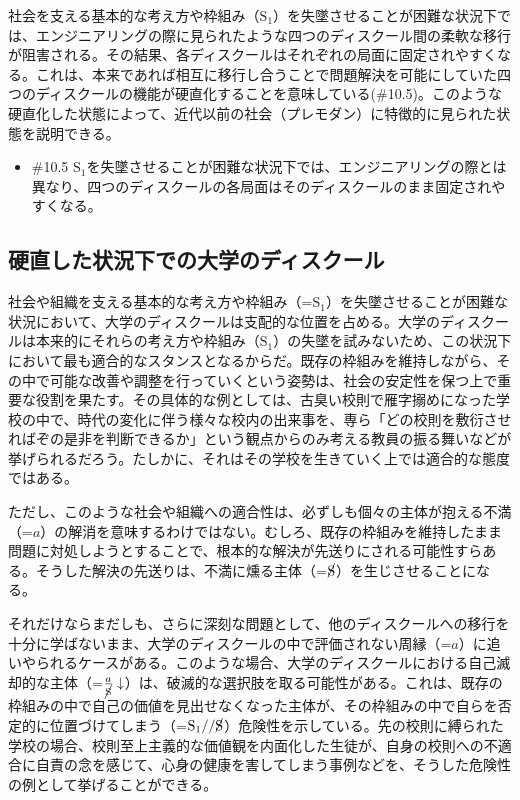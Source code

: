 社会を支える基本的な考え方や枠組み（\(\textrm{S}_1\)）を失墜させることが困難な状況下では、エンジニアリングの際に見られたような四つのディスクール間の柔軟な移行が阻害される。その結果、各ディスクールはそれぞれの局面に固定されやすくなる。これは、本来であれば相互に移行し合うことで問題解決を可能にしていた四つのディスクールの機能が硬直化することを意味している(\#10.5)。このような硬直化した状態によって、近代以前の社会（プレモダン）に特徴的に見られた状態を説明できる。

\begin{note}{}
  \begin{itemize}
    \tightlist
    \item{\#10.5}
      $\textrm{S}_1$を失墜させることが困難な状況下では、エンジニアリングの際とは異なり、四つのディスクールの各局面はそのディスクールのまま固定されやすくなる。
  \end{itemize}
\end{note}

\subsection{硬直した状況下での大学のディスクール}\label{ux786cux76f4ux3057ux305fux72b6ux6cc1ux4e0bux3067ux306eux5927ux5b66ux306eux30c7ux30a3ux30b9ux30afux30fcux30eb}

社会や組織を支える基本的な考え方や枠組み（=\(\textrm{S}_1\)）を失墜させることが困難な状況において、\mbox{大学のディスクール}は支配的な位置を占める。\mbox{大学のディスクール}は本来的にそれらの考え方や枠組み（\(\textrm{S}_1\)）の失墜を試みないため、この状況下において最も適合的なスタンスとなるからだ。既存の枠組みを維持しながら、その中で可能な改善や調整を行っていくという姿勢は、社会の安定性を保つ上で重要な役割を果たす。その具体的な例としては、古臭い校則で雁字搦めになった学校の中で、時代の変化に伴う様々な校内の出来事を、専ら「どの校則を敷衍させればぞの是非を判断できるか」という観点からのみ考える教員の振る舞いなどが挙げられるだろう。たしかに、それはその学校を生きていく上では適合的な態度ではある。

ただし、このような社会や組織への適合性は、必ずしも個々の主体が抱える不満（=\(a\)）の解消を意味するわけではない。むしろ、既存の枠組みを維持したまま問題に対処しようとすることで、根本的な解決が先送りにされる可能性すらある。そうした解決の先送りは、不満に燻る主体（=\(\cancel{\textrm{S}}\)）を生じさせることになる。

それだけならまだしも、さらに深刻な問題として、他のディスクールへの移行を十分に学ばないまま、\mbox{大学のディスクール}の中で評価されない周縁（=\(a\)）に追いやられるケースがある。このような場合、\mbox{大学のディスクール}における自己滅却的な主体（=\(\frac{a}{\cancel{\textrm{S}}}\downarrow\)）は、破滅的な選択肢を取る可能性がある。これは、既存の枠組みの中で自己の価値を見出せなくなった主体が、その枠組みの中で自らを否定的に位置づけてしまう（=\(\textrm{S}_1//\cancel{\textrm{S}}\)）危険性を示している。先の校則に縛られた学校の場合、校則至上主義的な価値観を内面化した生徒が、自身の校則への不適合に自責の念を感じて、心身の健康を害してしまう事例などを、そうした危険性の例として挙げることができる。

